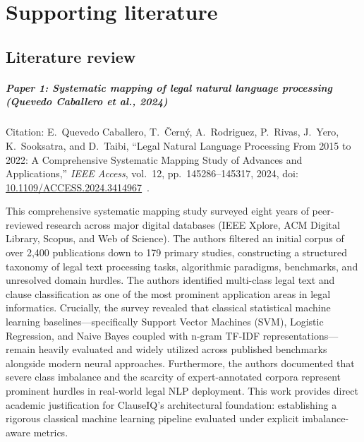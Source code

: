 \chapter{Supporting literature}
\label{ch:supporting_literature}

\section{Literature review}
\label{sec:literature_review}

\paragraph*{Paper 1: Systematic mapping of legal natural language processing (Quevedo Caballero et al., 2024)}

\noindent Citation: E.~Quevedo Caballero, T.~{\v{C}}ern{\'y}, A.~Rodriguez, P.~Rivas, J.~Yero, K.~Sooksatra, and D.~Taibi, ``Legal Natural Language Processing From 2015 to 2022: A Comprehensive Systematic Mapping Study of Advances and Applications,'' \textit{IEEE Access}, vol.~12, pp.~145286--145317, 2024, doi: \href{https://doi.org/10.1109/ACCESS.2024.3414967}{10.1109/ACCESS.2024.3414967}~\cite{quevedo2024legal}.

\vspace{0.5em}
This comprehensive systematic mapping study surveyed eight years of peer-reviewed research across major digital databases (IEEE Xplore, ACM Digital Library, Scopus, and Web of Science). The authors filtered an initial corpus of over 2,400 publications down to 179 primary studies, constructing a structured taxonomy of legal text processing tasks, algorithmic paradigms, benchmarks, and unresolved domain hurdles. The authors identified multi-class legal text and clause classification as one of the most prominent application areas in legal informatics. Crucially, the survey revealed that classical statistical machine learning baselines---specifically Support Vector Machines (SVM), Logistic Regression, and Naive Bayes coupled with n-gram TF-IDF representations---remain heavily evaluated and widely utilized across published benchmarks alongside modern neural approaches. Furthermore, the authors documented that severe class imbalance and the scarcity of expert-annotated corpora represent prominent hurdles in real-world legal NLP deployment. This work provides direct academic justification for ClauseIQ's architectural foundation: establishing a rigorous classical machine learning pipeline evaluated under explicit imbalance-aware metrics.

